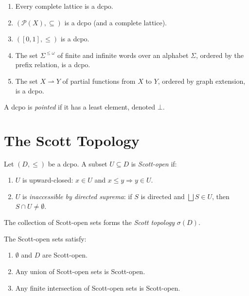 \begin{example}
\begin{enumerate}
  \item Every complete lattice is a dcpo.
  \item $(\mathcal{P}(X), \subseteq)$ is a dcpo (and a complete lattice).
  \item $([0,1], \leq)$ is a dcpo.
  \item The set $\Sigma^{\leq\omega}$ of finite and infinite words over an alphabet
    $\Sigma$, ordered by the prefix relation, is a dcpo.
  \item The set $X \rightharpoonup Y$ of partial functions from $X$ to $Y$, ordered by
    graph extension, is a dcpo.
\end{enumerate}
\end{example}

\begin{definition}
A dcpo is \emph{pointed} if it has a least element, denoted $\bot$.
\end{definition}

\section{The Scott Topology}

\begin{definition}
Let $(D,\leq)$ be a dcpo. A subset $U \subseteq D$ is \emph{Scott-open} if:
\begin{enumerate}
  \item $U$ is upward-closed: $x \in U$ and $x \leq y \Rightarrow y \in U$.
  \item $U$ is \emph{inaccessible by directed suprema}: if $S$ is directed and
    $\bigsqcup S \in U$, then $S \cap U \neq \emptyset$.
\end{enumerate}
The collection of Scott-open sets forms the \emph{Scott topology} $\sigma(D)$.
\end{definition}

\begin{proposition}
The Scott-open sets satisfy:
\begin{enumerate}
  \item $\emptyset$ and $D$ are Scott-open.
  \item Any union of Scott-open sets is Scott-open.
  \item Any finite intersection of Scott-open sets is Scott-open.
\end{enumerate}
\end{proposition}

